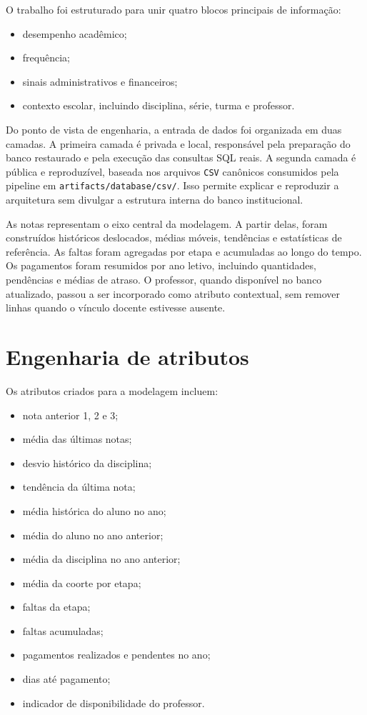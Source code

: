 O trabalho foi estruturado para unir quatro blocos principais de informa\c{c}\~ao:

\begin{itemize}
    \item desempenho acad\^emico;
    \item frequ\^encia;
    \item sinais administrativos e financeiros;
    \item contexto escolar, incluindo disciplina, s\'erie, turma e professor.
\end{itemize}

Do ponto de vista de engenharia, a entrada de dados foi organizada em duas camadas. A primeira camada \'e privada e local, respons\'avel pela prepara\c{c}\~ao do banco restaurado e pela execu\c{c}\~ao das consultas SQL reais. A segunda camada \'e p\'ublica e reproduz\'ivel, baseada nos arquivos \texttt{CSV} can\^onicos consumidos pela pipeline em \texttt{artifacts/database/csv/}. Isso permite explicar e reproduzir a arquitetura sem divulgar a estrutura interna do banco institucional.

As notas representam o eixo central da modelagem. A partir delas, foram constru\'idos hist\'oricos deslocados, m\'edias m\'oveis, tend\^encias e estat\'isticas de refer\^encia. As faltas foram agregadas por etapa e acumuladas ao longo do tempo. Os pagamentos foram resumidos por ano letivo, incluindo quantidades, pend\^encias e m\'edias de atraso. O professor, quando dispon\'ivel no banco atualizado, passou a ser incorporado como atributo contextual, sem remover linhas quando o v\'inculo docente estivesse ausente.

\section{Engenharia de atributos}
\label{sec:engenharia}

Os atributos criados para a modelagem incluem:

\begin{itemize}
    \item nota anterior 1, 2 e 3;
    \item m\'edia das \'ultimas notas;
    \item desvio hist\'orico da disciplina;
    \item tend\^encia da \'ultima nota;
    \item m\'edia hist\'orica do aluno no ano;
    \item m\'edia do aluno no ano anterior;
    \item m\'edia da disciplina no ano anterior;
    \item m\'edia da coorte por etapa;
    \item faltas da etapa;
    \item faltas acumuladas;
    \item pagamentos realizados e pendentes no ano;
    \item dias at\'e pagamento;
    \item indicador de disponibilidade do professor.
\end{itemize}

